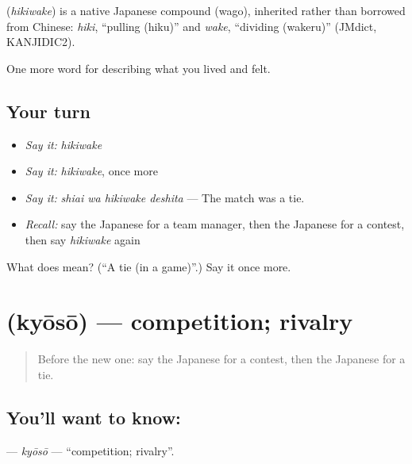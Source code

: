 \begin{cousinweb}
\textbf{} (\emph{hikiwake}) is a native Japanese compound (wago), inherited rather than borrowed from Chinese: \emph{hiki}, \textquotedblleft{}pulling (hiku)\textquotedblright{} and \emph{wake}, \textquotedblleft{}dividing (wakeru)\textquotedblright{} (JMdict, KANJIDIC2).
\end{cousinweb}

\begin{grammarlens}[title={What you've built}]
One more word for describing what you lived and felt.
\end{grammarlens}

\subsection*{Your turn}
\begin{itemize}
\raggedright
  \item \emph{Say it:} \emph{hikiwake}
  \item \emph{Say it:} \emph{hikiwake}, once more
  \item \emph{Say it:} \emph{shiai wa hikiwake deshita} — The match was a tie.
  \item \emph{Recall:} say the Japanese for a team manager, then the Japanese for a contest, then say \emph{hikiwake} again
\end{itemize}

\begin{tcolorbox}[breakable,colback=teal!4,colframe=teal!35!black,title={Before you move on}]
What does  mean? (\textquotedblleft{}A tie (in a game)\textquotedblright{}.) Say it once more.
\end{tcolorbox}
\section[\texorpdfstring{\ja{きょうそう} (kyōsō)}{きょうそう (kyōsō)}]{ (kyōsō) — competition; rivalry}

\label{lesson:JA-C462-kyousou}



\begin{quote}
Before the new one: say the Japanese for a contest, then the Japanese for a tie.
\end{quote}

\subsection*{You'll want to know: }
\textbf{} — \emph{kyōsō} — \textquotedblleft{}competition; rivalry\textquotedblright{}.

